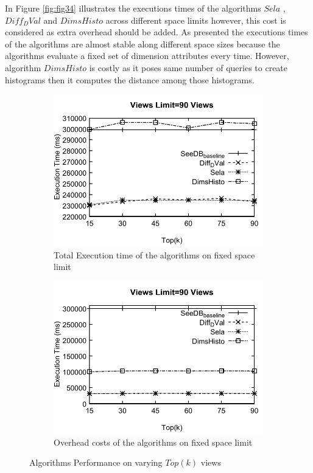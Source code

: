 In Figure \ref{fig:fig34} illustrates the executions times of the 
algorithms $Sela$ , $Diff_DVal$ and $DimsHisto$ across different space limits 
however, this cost is considered as extra overhead should be added. As presented 
the executions times of the algorithms are almost stable along different space sizes 
because the algorithms evaluate a fixed set of dimension attributes every time. 
However, algorithm $DimsHisto$ is costly as it poses same number of queries to create histograms
then it computes the distance among those histograms.\\

\begin{figure}
   \centering
  \begin{subfigure}[b]{0.42\textwidth}
    \includegraphics[width=\textwidth]{31.pdf}
    \caption{Total Execution time of the algorithms on fixed space limit}
    \label{fig:fig31a}
  \end{subfigure}
  \begin{subfigure}[b]{0.42\textwidth}
    \includegraphics[width=\textwidth]{32.pdf}
    \caption{Overhead costs of the algorithms on fixed space limit}
    \label{fig:fig32}
  \end{subfigure}
  \caption{Algorithms Performance on varying $Top(k)$ views}
\end{figure}

